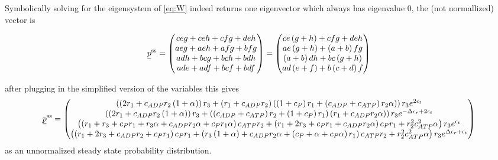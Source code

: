 \documentclass[11pt]{article}
\newcommand{\suf}[2]{\stackunder[0.5pt]{\stackunder[1pt]{\ensuremath{#1}}{\rule{\widthof{\ensuremath{#2}}*\real{0.9}}{.1ex}}}{}}
\newcommand{\su}[1]{\suf{#1}{#1}}
\begin{document}
Symbolically solving for the eigensystem of \cref{eq:W} indeed returns one eigenvector which always has eigenvalue 0, the (not normallized) vector is
\begin{tcolorbox}
    \begin{equation}
        \su{p}^\text{ss} = \begin{pmatrix}
            c e g + c e h + c f g + d e h \\
            a e g + a e h + a f g + b f g \\
            a d h + b c g + b c h + b d h \\
            a d e + a d f + b c f + b d f
        \end{pmatrix} = \begin{pmatrix}
            c e \left( g + h \right) + c f g + d e h \\
            a e \left( g + h \right) + \left( a + b \right) f g \\
            \left( a + b \right) d h + b c \left( g + h \right) \\
            a d \left( e + f \right) + b \left( c + d \right) f
        \end{pmatrix}
    \end{equation}
\end{tcolorbox}
after plugging in the simplified version of the variables this gives
\footnotesize
\begin{equation}
    \su{p}^\text{ss} = \begin{pmatrix}
        \left( \left( 2 r_1 + c_{ADP} r_2 \left( 1 + \alpha \right) \right) r_3 + \left( r_1 + c_{ADP} r_2 \right) \left( \left( 1 + c_P \right) r_1 + \left( c_{ADP} + c_{ATP} \right) r_2 \alpha \right) \right) r_3 e^{2 \epsilon_{t}} \\
        \left( \left( 2 r_1 + c_{ADP} r_2 \left( 1 + \alpha \right) \right) r_3 + \left( \left( c_{ADP} + c_{ATP} \right) r_2 + \left( 1 + c_P \right) r_1 \right) \left( r_1 + c_{ADP} r_2 \alpha \right) \right) r_3 e^{ - \Delta\epsilon_{r} + 2 \epsilon_{t}} \\
        \left( \left( r_1 + r_3 + c_P r_1 + r_3 \alpha + c_{ADP} r_2 \alpha + c_P r_1 \alpha \right) c_{ATP} r_2 + \left( r_1 + 2 r_3 + c_P r_1 + c_{ADP} r_2 \alpha \right) c_P r_1 + r_2^{2} c_{ATP}^{2} \alpha \right) r_3 e^{\epsilon_{t}} \\
        \left( \left( r_1 + 2 r_3 + c_{ADP} r_2 + c_P r_1 \right) c_P r_1 + \left( r_3 \left( 1 + \alpha \right) + c_{ADP} r_2 \alpha + \left( c_P + \alpha + c_P \alpha \right) r_1 \right) c_{ATP} r_2 + r_2^{2} c_{ATP}^{2} \alpha \right) r_3 e^{\Delta\epsilon_{r} + \epsilon_{t}}
    \end{pmatrix}
\end{equation}
\normalsize
as an unnormalized steady state probability distribution.
\end{document}
